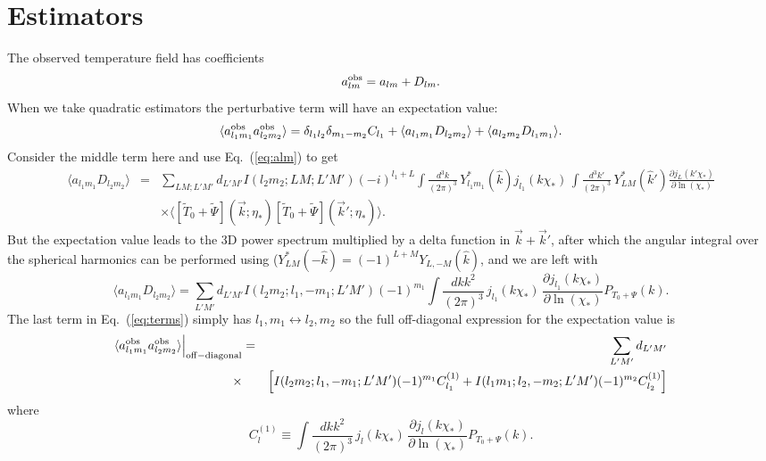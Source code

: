 \documentclass[prd,amsmath,amssymb,floatfix,superscriptaddress,nofootinbib,preprintnumbers]{revtex4-1}
\def\be{\begin{equation}}
\def\ee{\end{equation}}
\def\bea{\begin{eqnarray}}
\def\eea{\end{eqnarray}}
\newcommand{\vs}{\nonumber\\}
\newcommand{\ec}[1]{Eq.~(\ref{eq:#1})}
\newcommand{\eql}[1]{\label{eq:#1}}
\begin{document}
\section{Estimators}

The observed temperature field has coefficients
\be
a^{\rm obs}_{lm} = a_{lm} + D_{lm}
.\ee
When we take quadratic estimators the perturbative term will have an expectation value:
\be
\langle a^{\rm obs}_{l_1m_1} a^{\rm obs}_{l_2m_2} \rangle= \delta_{l_1l_2}\delta_{m_1-m_2}C_{l_1} + \langle a_{l_1m_1}D_{l_2m_2}\rangle+ \langle a_{l_2m_2}D_{l_1m_1}\rangle
.\eql{terms}
\ee
Consider the middle term here and use \ec{alm} to get
\bea
\langle a_{l_1m_1}D_{l_2m_2}\rangle&=&\sum_{LM;L'M'}d_{L'M'}  I(l_2m_2;LM;L'M')
 (-i)^{l_1+L} \int \frac{d^3k}{(2\pi)^3}\, Y_{l_1m_1}^*(\hat k) j_{l_1}(k\chi_*)\,
 \int \frac{d^3k'}{(2\pi)^3}\, Y_{LM}^*(\hat k') \frac{\partial j_L(k'\chi_*)}{\partial\ln(\chi_*)}
\vs
&&\times\langle  [\tilde T_0+\tilde\Psi](\vec k;\eta_*)  [\tilde T_0+\tilde\Psi](\vec k';\eta_*) \rangle.
\eea
But the expectation value leads to the 3D power spectrum multiplied by a delta function in $\vec k+\vec k'$, after which the angular integral over the spherical harmonics can be performed using ($Y_{LM}^*(-\hat k)=(-1)^{L+M}Y_{L,-M}(\hat k)$, and we are left with
\be
\langle a_{l_1m_1}D_{l_2m_2}\rangle=\sum_{L'M'}d_{L'M'}  I(l_2m_2;l_1,-m_1;L'M')
 (-1)^{m_1} \int \frac{dk k^2}{(2\pi)^3}\, j_{l_1}(k\chi_*)\,\frac{\partial j_{l_1}(k\chi_*)}{\partial\ln(\chi_*)}P_{T_0+\Psi}(k).
\ee
The last term in \ec{terms} simply has $l_1,m_1\leftrightarrow l_2,m_2$ so the full off-diagonal expression for the expectation value is
\bea
\langle a^{\rm obs}_{l_1m_1} a^{\rm obs}_{l_2m_2} \rangle\Big\vert_{\rm off-diagonal} &=&
\sum_{L'M'}d_{L'M'}  
 \vs
\times &&
 \left[
 I(l_2m_2;l_1,-m_1;L'M')
 (-1)^{m_1} C^{(1)}_{l_1}
  + 
 I(l_1m_1;l_2,-m_2;L'M')
 (-1)^{m_2}C^{(1)}_{l_2}
 \right]\eea
where
\be
C^{(1)}_{l}\equiv \int \frac{dk k^2}{(2\pi)^3}\, j_{l}(k\chi_*)\,\frac{\partial j_{l}(k\chi_*)}{\partial\ln(\chi_*)}P_{T_0+\Psi}(k).
\ee
\end{document}
